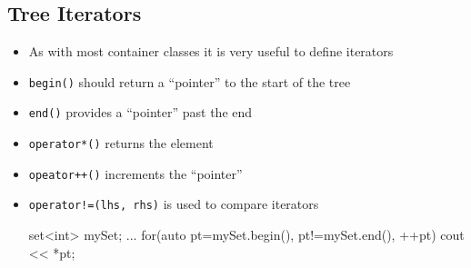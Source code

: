 \begin{slide}
\section[-2]{Tree Iterators}

\begin{PauseHighLight}
  \begin{itemize}
  \item As with most container classes it is very useful to define
    iterators\pause
  \item \texttt{begin()} should return a ``pointer'' to the start of
    the tree\pause
  \item \texttt{end()} provides a ``pointer'' past the end\pause
  \item \texttt{operator*()} returns the element\pause
  \item \texttt{opeator++()} increments the ``pointer''\pause
  \item \texttt{operator!=(lhs, rhs)} is used to compare iterators\pause
    \begin{cpp}
      set<int> mySet;
      ...
      for(auto pt=mySet.begin(), pt!=mySet.end(), ++pt) {
        cout << *pt;
      }
    \end{cpp}\pause
  \end{itemize}
\end{PauseHighLight}
\end{slide}


